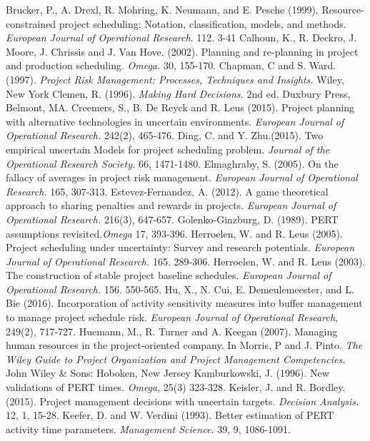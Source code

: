 \documentclass[11pt]{article}
\begin{document}
\begin{thebibliography}{10}
 Brucker, P., A. Drexl, R. Mohring, K. Neumann, and E. Pesche (1999). Resource-constrained project scheduling: Notation, classification, models,
 and methods. {\em European Journal of Operational Research}. 112. 3-41
   Calhoun, K., R. Deckro, J. Moore, J. Chrissis and J. Van Hove. (2002). Planning and re-planning in project and production scheduling. {\em Omega.} 30, 155-170.
  	Chapman, C and S. Ward. (1997). {\em Project Risk Management: Processes, Techniques and Insights.} Wiley, New York
  	Clemen, R. (1996). {\em Making Hard Decisions.} 2nd ed. Duxbury Press, Belmont, MA.
    Creemers, S., B. De Reyck and R. Leus (2015). Project planning with alternative technologies in uncertain environments. {\em European Journal of Operational Research.} 242(2), 465-476.
  	Ding, C. and Y. Zhu.(2015). Two empirical uncertain Models for project scheduling problem. {\em Journal of the Operational Research Society.} 66, 1471-1480.
 	Elmaghraby, S. (2005). On the fallacy of averages in project risk management. {\em European Journal of Operational Research.} 165, 307-313.
   Estevez-Fernandez, A. (2012).  A game theoretical approach to sharing penalties and rewards in projects. {\em European Journal of Operational Research.} 216(3), 647-657.
   	Golenko-Ginzburg, D. (1989). PERT assumptions revisited.{\em Omega} 17, 393-396.
  	Herroelen, W. and R. Leus (2005). Project scheduling under uncertainty: Survey and research potentials. {\em European Journal of Operational Research.} 165. 289-306.
  	Herroelen, W. and R. Leus (2003). The construction of stable project baseline schedules. {\em European Journal of Operational Research.} 156. 550-565.
    Hu, X., N. Cui, E. Demeulemeester, and L. Bie (2016). Incorporation of activity sensitivity measures into buffer management to manage project schedule risk. {\em European Journal of Operational Research}, 249(2), 717-727.
  	Huemann, M., R. Turner and A. Keegan (2007). Managing human resources in the project-oriented company. In Morris, P and J. Pinto. {\em The Wiley Guide to Project Organization and Project Management Competencies.} John Wiley \& Sons: Hoboken, New Jersey
  	Kamburkowski, J. (1996). New validations of PERT times.  {\em Omega}, 25(3) 323-328.
  	Keisler, J. and R. Bordley. (2015). Project management decisions with uncertain targets. {\em Decision Analysis.} 12, 1, 15-28.
   Keefer, D. and W. Verdini (1993). Better estimation of PERT activity time parameters. {\em Management Science.} 39, 9, 1086-1091.

\end{thebibliography}
\end{document}
